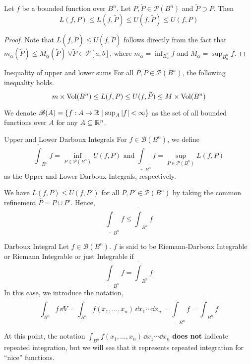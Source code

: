 \documentclass[../Analysis-3.tex]{subfiles}
\begin{document}
\begin{Thm}{}{}
  Let $f$ be a bounded function over $B^n$. Let $P, \widetilde{P} \in \mathscr{P}(B^n)$ and $\widetilde{P} \supset P$. Then
  \[  L(f,P) \leq L(f, \widetilde{P}) \leq U(f,\widetilde{P}) \leq U(f,P)  \]
\end{Thm}

\begin{proof}
  Note that $L(f, \widetilde{P}) \leq U(f,\widetilde{P})$ follows directly from the fact that $m_\alpha (\widetilde{P}) \leq M_\alpha (\widetilde{P})\ \forall \widetilde{P} \in \mathscr{P}[a,b]$, where $m_\alpha = \inf_{B^n_\alpha} f$ and $M_\alpha = \sup_{B_\alpha ^n} f$.
\end{proof}

\begin{Cor}{Inequality of upper and lower sums}{}
  For all $ P, \widetilde{P} \in \mathscr{P}(B^n) $, the following inequality holds.
  \[  m \times \operatorname{Vol}(B^n) \leq L(f,P) \leq U(f, \widetilde{P}) \leq M \times \operatorname{Vol}(B^n)  \]
\end{Cor}

We denote $ \mathscr{B}(A) = \{f:A \to \mathbb{R} \mid \sup_A \abs{f} < \infty\} $ as the set of all bounded functions over $ A $ for any $ A \subseteq \mathbb{R}^n $.

\begin{Def}{Upper and Lower Darboux Integrals}{}
  For $f \in \mathscr{B}(B^n)$, we define
  \[  \overline{\int}_{B^n} f = \inf_{P \in \mathscr{P}(B^n)} U(f,P) \text{  and  } \underline{\int}_{B^n} f = \sup_{P \in \mathscr{P}(B^n)} L(f,P)  \]
  as the Upper and Lower Darboux Integrals, respectively.
\end{Def}

We have $L(f, P) \leq U(f, P')$ for all $P, P' \in \mathscr{P}(B^n)$ by taking the common refinement $\widehat{P} = P \cup P'$. Hence,
\[
  \underline{\int}_{B^n} f \leq \overline{\int}_{B^n} f
\]

\begin{Def}{Darboux Integral}{}
  Let \( f \in \mathscr{B}(B^n) \). \( f \) is said to be Riemann-Darboux Integrable or Riemann Integrable or just Integrable if
  \[
    \underline{\int}_{B^n} f = \overline{\int}_{B^n} f
  \]
  In this case, we introduce the notation,
  \[
    \int_{B^n} f \, \dd V = \int_{B^n} f(x_1, \dots, x_n) \, \dd x_1 \cdots \dd x_n = \underline{\int}_{B^n} f = \overline{\int}_{B^n} f
  \]
\end{Def}
At this point, the notation $\displaystyle\int_{B^n} f(x_1, \dots, x_n) \, \dd x_1 \cdots \dd x_n$ \textbf{does not} indicate repeated integration, but we will see that it represents repeated integration for ``nice'' functions.
\end{document}
